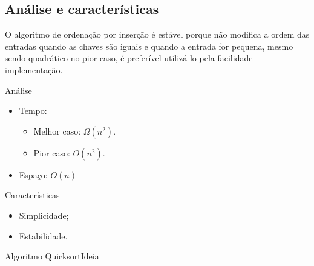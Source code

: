 \subsection{Análise e características}
O algoritmo de ordenação por inserção é estável porque não modifica a
ordem das entradas quando as chaves são iguais e quando a entrada for
pequena, mesmo sendo quadrático no pior caso, é preferível utilizá-lo
pela facilidade implementação.

\begin{frame}{\insertlecture}
  \begin{block}{Análise}
    \begin{itemize}
    \item Tempo:
      \begin{itemize}
      \item Melhor caso: $\Omega (n^2)$.
      \item Pior caso: $O(n^2)$.
      \end{itemize}
    \item Espaço: $O(n)$
    \end{itemize}
  \end{block}
  
  \begin{block}{Características}
    \begin{itemize}
    \item Simplicidade;
    \item Estabilidade.
    \end{itemize}
  \end{block}
\end{frame}





\begin{frame}{Algoritmo Quicksort}{Ideia}
\end{frame}

